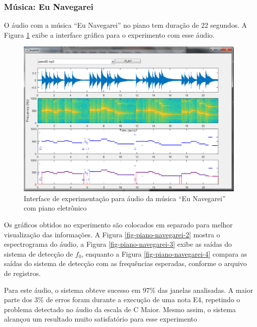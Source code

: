 \subsubsection{Música: Eu Navegarei}

O áudio com a música ``Eu Navegarei'' no piano tem duração de 22 segundos. A Figura \ref{fig-piano-navegarei} exibe a interface gráfica para o experimento com esse áudio.

\begin{figure}
	\centering
	\includegraphics[width=0.75\linewidth]{pasta1_figuras/piano-navegarei.png}
	\caption{Interface de experimentação para áudio da música ``Eu Navegarei'' com piano eletrônico}
	\label{fig-piano-navegarei}
\end{figure}

Os gráficos obtidos no experimento são colocados em separado para melhor visualização das informações. A Figura \ref{fig-piano-navegarei-2} mostra o espectrograma do áudio, a Figura \ref{fig-piano-navegarei-3} exibe as saídas do sistema de detecção de $f_0$, enquanto a Figura \ref{fig-piano-navegarei-4} compara as saídas do sistema de detecção com as frequências esperadas, conforme o arquivo de registros.


Para este áudio, o sistema obteve sucesso em 97\% das janelas analisadas. A maior parte dos 3\% de erros foram durante a execução de uma nota E4, repetindo o problema detectado no áudio da escala de C Maior. Mesmo assim, o sistema alcançou um resultado muito satisfatório para esse experimento


